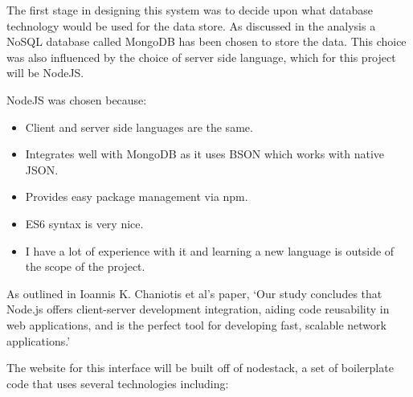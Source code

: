 The first stage in designing this system was to decide upon what database technology would be used for the data store. As discussed in the analysis a NoSQL database called MongoDB has been chosen to store the data. This choice was also influenced by the choice of server side language, which for this project will be NodeJS. 

NodeJS was chosen because:

\begin{itemize}
  \item Client and server side languages are the same.
  \item Integrates well with MongoDB as it uses BSON which works with native JSON.
  \item Provides easy package management via npm.
  \item ES6 syntax is very nice.
  \item I have a lot of experience with it and learning a new language is outside of the scope of the project.
\end{itemize}

As outlined in Ioannis K. Chaniotis et al's paper, `Our study concludes that Node.js offers client-server development integration, aiding code reusability in web applications, and is the perfect tool for developing fast, scalable network applications.'\cite{node-perf}

The website for this interface will be built off of nodestack\cite{nodestack}, a set of boilerplate code that uses several technologies including:


